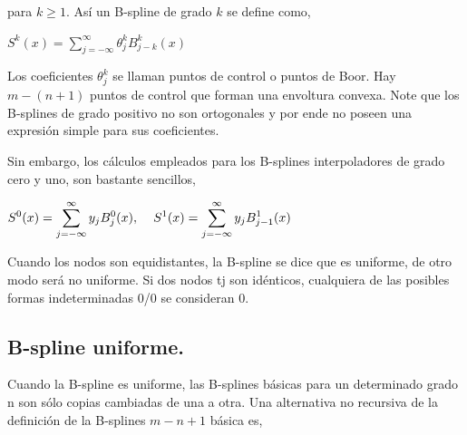 \vspace{0.5cm}

\noindent para $k\geq 1$. As\'i un B-spline de grado $k$ se define como,\\

\begin{center}

$\displaystyle{S^{k}(x) = \sum_{j=-\infty}^{\infty} \theta^{k}_{j} B^{k}_{j-k}(x)}$
\end{center}

\vspace{0.5cm}

\hspace{0.4cm} Los coeficientes $\theta^{k}_{j}$ se llaman puntos de control o puntos de Boor. Hay $m-(n+1)$ puntos de control que forman una envoltura convexa. Note que los B-splines de grado positivo no son ortogonales y por ende no poseen una expresi\'on simple para sus coeficientes.

\hspace{0.4cm} Sin embargo, los c\'alculos empleados para los B-splines interpoladores de grado cero y uno, son bastante sencillos,\\

\begin{center}

$\displaystyle{S^{0}(x) = \sum_{j=-\infty}^{\infty} y_{j} B^{0}_{j}(x),\hspace{0.4cm} S^{1}(x) = \sum_{j=-\infty}^{\infty} y_{j} B^{1}_{j-1}(x) }$
\end{center}

\vspace{0.5cm}


\hspace{0.4cm} Cuando los nodos son equidistantes, la B-spline se dice que es uniforme, de otro modo ser\'a no uniforme. Si dos nodos tj son id\'enticos, cualquiera de las posibles formas indeterminadas 0/0 se consideran 0.


\subsection{B-spline uniforme.\\}

\hspace{0.4cm} Cuando la B-spline es uniforme, las B-splines b\'asicas para un determinado grado n son s\'olo copias cambiadas de una a otra. Una alternativa no recursiva de la definici\'on de la B-splines $m-n+1$ b\'asica es,


